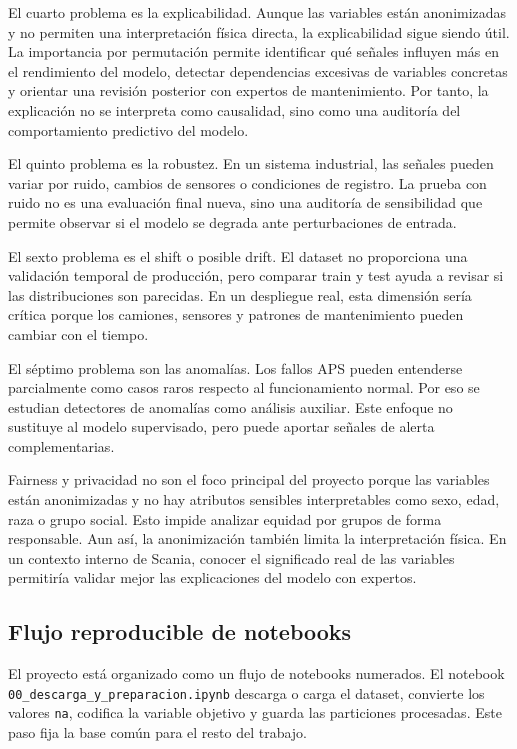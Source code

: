 \documentclass[11pt,a4paper]{article}
\begin{document}
El cuarto problema es la explicabilidad. Aunque las variables están anonimizadas y no permiten una interpretación física directa, la explicabilidad sigue siendo útil. La importancia por permutación permite identificar qué señales influyen más en el rendimiento del modelo, detectar dependencias excesivas de variables concretas y orientar una revisión posterior con expertos de mantenimiento. Por tanto, la explicación no se interpreta como causalidad, sino como una auditoría del comportamiento predictivo del modelo.

El quinto problema es la robustez. En un sistema industrial, las señales pueden variar por ruido, cambios de sensores o condiciones de registro. La prueba con ruido no es una evaluación final nueva, sino una auditoría de sensibilidad que permite observar si el modelo se degrada ante perturbaciones de entrada.

El sexto problema es el shift o posible drift. El dataset no proporciona una validación temporal de producción, pero comparar train y test ayuda a revisar si las distribuciones son parecidas. En un despliegue real, esta dimensión sería crítica porque los camiones, sensores y patrones de mantenimiento pueden cambiar con el tiempo.

El séptimo problema son las anomalías. Los fallos APS pueden entenderse parcialmente como casos raros respecto al funcionamiento normal. Por eso se estudian detectores de anomalías como análisis auxiliar. Este enfoque no sustituye al modelo supervisado, pero puede aportar señales de alerta complementarias.

Fairness y privacidad no son el foco principal del proyecto porque las variables están anonimizadas y no hay atributos sensibles interpretables como sexo, edad, raza o grupo social. Esto impide analizar equidad por grupos de forma responsable. Aun así, la anonimización también limita la interpretación física. En un contexto interno de Scania, conocer el significado real de las variables permitiría validar mejor las explicaciones del modelo con expertos.

\subsection{Flujo reproducible de notebooks}
\label{sec_flujo_notebooks}

El proyecto está organizado como un flujo de notebooks numerados. El notebook \texttt{00\_descarga\_y\_\allowbreak preparacion.ipynb} descarga o carga el dataset, convierte los valores \texttt{na}, codifica la variable objetivo y guarda las particiones procesadas. Este paso fija la base común para el resto del trabajo.
\end{document}
